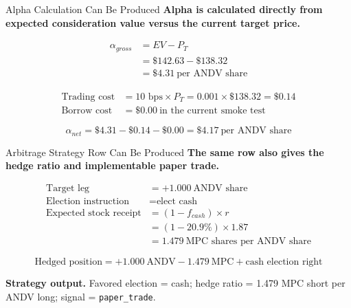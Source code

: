 \documentclass[aspectratio=169,11pt]{beamer}
\newcommand{\usd}[1]{\$#1}
\begin{document}
\begin{frame}{Alpha Calculation Can Be Produced}
\small
\textbf{Alpha is calculated directly from expected consideration value versus the current target price.}

\vspace{0.4em}
\begin{align*}
\alpha_{gross}
&= EV - P_T \\
&= \usd{142.63} - \usd{138.32} \\
&= \usd{4.31}\ \text{per ANDV share}
\end{align*}

\vspace{0.2em}
\begin{align*}
\text{Trading cost} &= 10\text{ bps} \times P_T
                    = 0.001 \times \usd{138.32}
                    = \usd{0.14} \\
\text{Borrow cost} &= \usd{0.00}\ \text{in the current smoke test}
\end{align*}

\vspace{0.2em}
\[
\alpha_{net}
= \usd{4.31} - \usd{0.14} - \usd{0.00}
= \usd{4.17}\ \text{per ANDV share}
\]
\end{frame}

\begin{frame}{Arbitrage Strategy Row Can Be Produced}
\small
\textbf{The same row also gives the hedge ratio and implementable paper trade.}

\vspace{0.4em}
\begin{align*}
\text{Target leg} &= +1.000\ \text{ANDV share} \\
\text{Election instruction} &= \text{elect cash} \\
\text{Expected stock receipt} &= (1-f_{cash}) \times r \\
&= (1-20.9\%) \times 1.87 \\
&= 1.479\ \text{MPC shares per ANDV share}
\end{align*}

\vspace{0.2em}
\[
\text{Hedged position}
= +1.000\ \text{ANDV}
-1.479\ \text{MPC}
+ \text{cash election right}
\]

\vspace{0.3em}
\textbf{Strategy output.} Favored election = cash; hedge ratio = 1.479 MPC short per ANDV long; signal = \texttt{paper\_trade}.
\end{frame}
\end{document}
